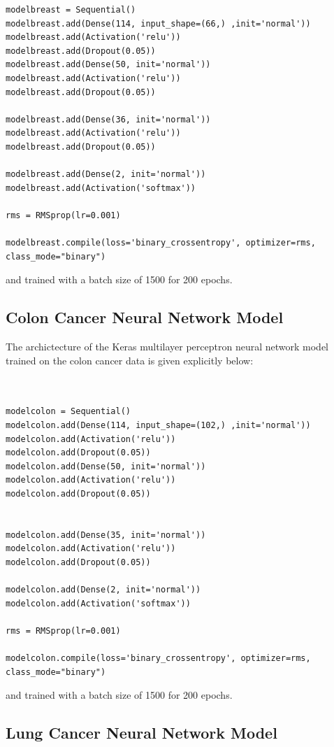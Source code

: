 \documentclass[a4paper,11pt]{article}
\begin{document}
\begin{verbatim}
modelbreast = Sequential()
modelbreast.add(Dense(114, input_shape=(66,) ,init='normal'))
modelbreast.add(Activation('relu'))
modelbreast.add(Dropout(0.05))
modelbreast.add(Dense(50, init='normal'))
modelbreast.add(Activation('relu'))
modelbreast.add(Dropout(0.05))

modelbreast.add(Dense(36, init='normal'))
modelbreast.add(Activation('relu'))
modelbreast.add(Dropout(0.05))

modelbreast.add(Dense(2, init='normal'))
modelbreast.add(Activation('softmax'))

rms = RMSprop(lr=0.001)

modelbreast.compile(loss='binary_crossentropy', optimizer=rms, class_mode="binary")

\end{verbatim}

and trained with a batch size of 1500 for 200 epochs.

\subsection{Colon Cancer Neural Network Model}
\label{subsec:colonnn}

The archictecture of the Keras multilayer perceptron neural network model 
trained on the colon cancer data is given explicitly below:

\begin{verbatim}


modelcolon = Sequential()
modelcolon.add(Dense(114, input_shape=(102,) ,init='normal'))
modelcolon.add(Activation('relu'))
modelcolon.add(Dropout(0.05))
modelcolon.add(Dense(50, init='normal'))
modelcolon.add(Activation('relu'))
modelcolon.add(Dropout(0.05))


modelcolon.add(Dense(35, init='normal'))
modelcolon.add(Activation('relu'))
modelcolon.add(Dropout(0.05))

modelcolon.add(Dense(2, init='normal'))
modelcolon.add(Activation('softmax'))

rms = RMSprop(lr=0.001)

modelcolon.compile(loss='binary_crossentropy', optimizer=rms, class_mode="binary")

\end{verbatim}

and trained with a batch size of 1500 for 200 epochs.


\subsection{Lung Cancer Neural Network Model}
\label{subsec:lungnn}
\end{document}
